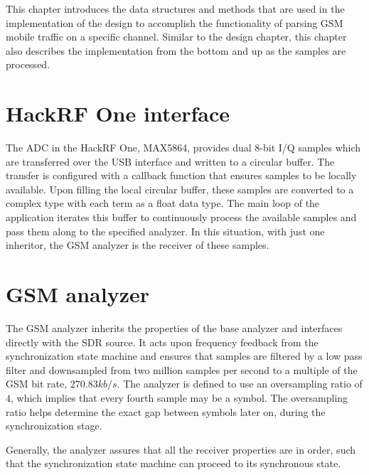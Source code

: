This chapter introduces the data structures and methods that are used
in the implementation of the design to accomplish the functionality of
parsing \gls{GSM} mobile traffic on a specific channel. Similar to the
design chapter, this chapter also describes the implementation from
the bottom and up as the samples are processed.

\section{HackRF One interface}
The \gls{ADC} in the HackRF One, MAX5864, provides dual $8$-bit
\gls{I}/\gls{Q} samples which are transferred over the \gls{USB}
interface and written to a circular buffer. The transfer is configured
with a callback function that ensures samples to be locally
available. Upon filling the local circular buffer, these samples are
converted to a complex type with each term as a float data type. The
main loop of the application iterates this buffer to continuously
process the available samples and pass them along to the specified
analyzer. In this situation, with just one inheritor, the \gls{GSM}
analyzer is the receiver of these samples.

\section{GSM analyzer}
The \gls{GSM} analyzer inherits the properties of the base analyzer
and interfaces directly with the \gls{SDR} source. It acts upon
frequency feedback from the synchronization state machine and ensures
that samples are filtered by a low pass filter and downsampled from
two million samples per second to a multiple of the \gls{GSM} bit
rate, $270.83\si{kb/s}$. The analyzer is defined to use an
oversampling ratio of $4$, which implies that every fourth sample may
be a symbol. The oversampling ratio helps determine the exact gap
between symbols later on, during the synchronization stage.

Generally, the analyzer assures that all the receiver properties are
in order, such that the synchronization state machine can proceed to
its synchronous state.

